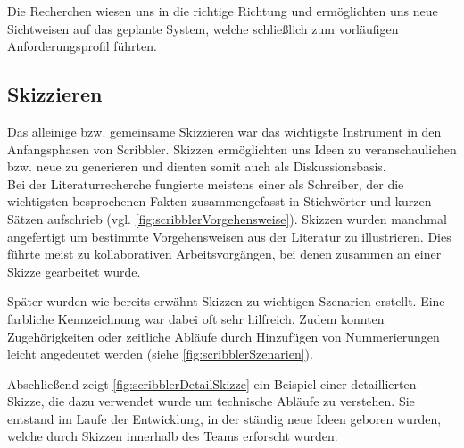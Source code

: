 \medskip Die Recherchen wiesen uns in die richtige Richtung und ermöglichten uns neue Sichtweisen auf das geplante System, welche schließlich zum vorläufigen Anforderungsprofil führten.

\subsection{Skizzieren}
Das alleinige bzw. gemeinsame Skizzieren war das wichtigste Instrument in den Anfangsphasen von Scribbler. Skizzen ermöglichten uns Ideen zu veranschaulichen bzw. neue zu generieren und dienten somit auch als Diskussionsbasis. \\
Bei der Literaturrecherche fungierte meistens einer als Schreiber, der die wichtigsten besprochenen Fakten zusammengefasst in Stichwörter und kurzen Sätzen aufschrieb (vgl. \autoref{fig:scribblerVorgehensweise}). Skizzen wurden manchmal angefertigt um bestimmte Vorgehensweisen aus der Literatur zu illustrieren. Dies führte meist zu kollaborativen Arbeitsvorgängen, bei denen zusammen an einer Skizze gearbeitet wurde. 

\medskip Später wurden wie bereits erwähnt Skizzen zu wichtigen Szenarien erstellt. Eine farbliche Kennzeichnung war dabei oft sehr hilfreich. Zudem konnten Zugehörigkeiten oder zeitliche Abläufe durch Hinzufügen von Nummerierungen leicht angedeutet werden (siehe \autoref{fig:scribblerSzenarien}).

\medskip Abschließend zeigt \autoref{fig:scribblerDetailSkizze} ein Beispiel einer detaillierten Skizze, die dazu verwendet wurde um technische Abläufe zu verstehen. Sie entstand im Laufe der Entwicklung, in der ständig neue Ideen geboren wurden, welche durch Skizzen innerhalb des Teams erforscht wurden.


